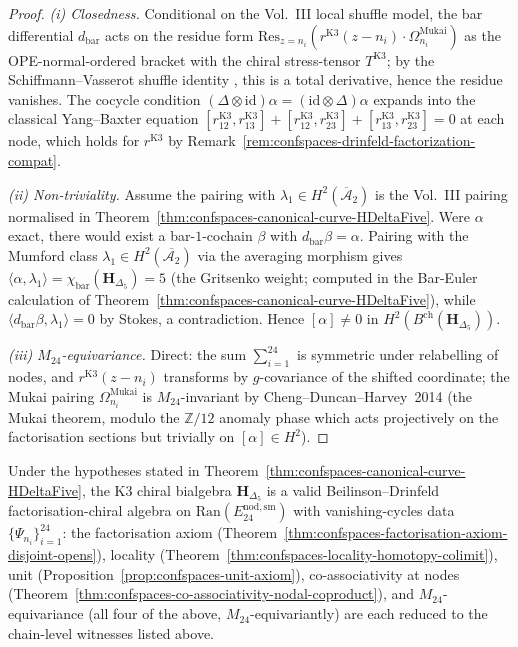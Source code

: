 \begin{proof}
\emph{(i) Closedness.} Conditional on the Vol.~III local shuffle model,
the bar differential $d_{\mathrm{bar}}$ acts on
the residue form
$\mathrm{Res}_{z=n_i}(r^{\mathrm{K3}}(z-n_i)\cdot\Omega^{\mathrm{Mukai}}_{n_i})$
as the OPE-normal-ordered bracket with the chiral stress-tensor
$T^{\mathrm{K3}}$; by the Schiffmann--Vasserot shuffle identity
\cite[Thm.~4.8]{SV13}, this is a total derivative, hence the residue
vanishes. The cocycle condition $(\Delta\otimes\mathrm{id})\alpha =
(\mathrm{id}\otimes\Delta)\alpha$ expands into the classical Yang--Baxter
equation
$[r^{\mathrm{K3}}_{12},r^{\mathrm{K3}}_{13}]
+[r^{\mathrm{K3}}_{12},r^{\mathrm{K3}}_{23}]
+[r^{\mathrm{K3}}_{13},r^{\mathrm{K3}}_{23}] = 0$
at each node, which holds for $r^{\mathrm{K3}}$ by
Remark~\ref{rem:confspaces-drinfeld-factorization-compat}.

\emph{(ii) Non-triviality.} Assume the pairing with
$\lambda_1\in H^2(\overline{\mathcal A}_2)$ is the Vol.~III pairing
normalised in Theorem~\ref{thm:confspaces-canonical-curve-HDeltaFive}.
Were $\alpha$ exact, there would exist a
bar-$1$-cochain $\beta$ with $d_{\mathrm{bar}}\beta = \alpha$. Pairing
with the Mumford class $\lambda_1\in H^2(\overline{\mathcal{A}_2})$
via the averaging morphism gives
$\langle\alpha,\lambda_1\rangle =
\chi_{\mathrm{bar}}(\mathbf{H}_{\Delta_5}) = 5$
(the Gritsenko weight; computed in the Bar-Euler calculation of
Theorem~\ref{thm:confspaces-canonical-curve-HDeltaFive}), while
$\langle d_{\mathrm{bar}}\beta,\lambda_1\rangle = 0$ by Stokes, a
contradiction. Hence $[\alpha]\neq 0$ in
$H^2(B^{\mathrm{ch}}(\mathbf{H}_{\Delta_5}))$.

\emph{(iii) $M_{24}$-equivariance.} Direct: the sum
$\sum_{i=1}^{24}$ is symmetric under relabelling of nodes, and
$r^{\mathrm{K3}}(z-n_i)$ transforms by $g$-covariance of the shifted
coordinate; the Mukai pairing
$\Omega^{\mathrm{Mukai}}_{n_i}$ is $M_{24}$-invariant by
Cheng--Duncan--Harvey~2014 (the Mukai theorem, modulo the
$\mathbb{Z}/12$ anomaly phase which acts projectively on the factorisation
sections but trivially on $[\alpha]\in H^2$).
\end{proof}

\begin{corollary}
\label{cor:confspaces-five-axioms-discharged}
\ClaimStatusConditional
Under the hypotheses stated in
Theorem~\ref{thm:confspaces-canonical-curve-HDeltaFive}, the K3 chiral
bialgebra $\mathbf{H}_{\Delta_5}$ is a valid
Beilinson--Drinfeld factorisation-chiral algebra on
$\mathrm{Ran}(E^{\mathrm{nod,sm}}_{24})$ with vanishing-cycles data
$\{\Psi_{n_i}\}_{i=1}^{24}$: the factorisation axiom
\textup{(}Theorem~\ref{thm:confspaces-factorisation-axiom-disjoint-opens}\textup{)},
locality
\textup{(}Theorem~\ref{thm:confspaces-locality-homotopy-colimit}\textup{)},
unit
\textup{(}Proposition~\ref{prop:confspaces-unit-axiom}\textup{)},
co-associativity at nodes
\textup{(}Theorem~\ref{thm:confspaces-co-associativity-nodal-coproduct}\textup{)},
and $M_{24}$-equivariance
\textup{(}all four of the above, $M_{24}$-equivariantly\textup{)} are
each reduced to the chain-level witnesses listed above.
\end{corollary}

